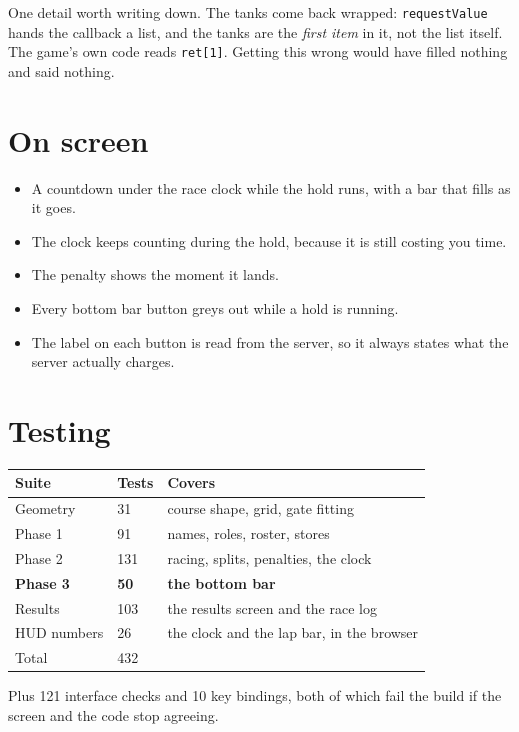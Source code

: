 \documentclass[11pt,a4paper]{article}
\newcommand{\code}[1]{\texttt{\small #1}}
\begin{document}
One detail worth writing down. The tanks come back wrapped:
\code{requestValue} hands the callback a list, and the tanks are the
\emph{first item} in it, not the list itself. The game's own code reads
\code{ret[1]}. Getting this wrong would have filled nothing and said nothing.

\section{On screen}

\begin{itemize}
  \item A countdown under the race clock while the hold runs, with a bar that
        fills as it goes.
  \item The clock keeps counting during the hold, because it is still costing
        you time.
  \item The penalty shows the moment it lands.
  \item Every bottom bar button greys out while a hold is running.
  \item The label on each button is read from the server, so it always states
        what the server actually charges.
\end{itemize}

\section{Testing}

\begin{longtable}{@{}p{50mm}p{20mm}p{60mm}@{}}
\toprule
\textbf{Suite} & \textbf{Tests} & \textbf{Covers} \\
\midrule
\endhead
Geometry     & 31  & course shape, grid, gate fitting \\
Phase 1      & 91  & names, roles, roster, stores \\
Phase 2      & 131 & racing, splits, penalties, the clock \\
\textbf{Phase 3} & \textbf{50} & \textbf{the bottom bar} \\
Results      & 103 & the results screen and the race log \\
HUD numbers  & 26  & the clock and the lap bar, in the browser \\
\midrule
Total        & 432 & \\
\bottomrule
\end{longtable}

Plus 121 interface checks and 10 key bindings, both of which fail the build if
the screen and the code stop agreeing.
\end{document}
